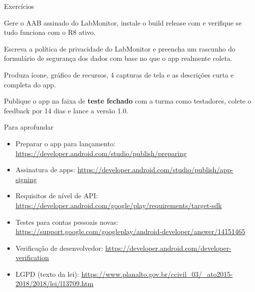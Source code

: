 \documentclass[aspectratio=169,10pt]{beamer}
\begin{document}
\begin{frame}{Exercícios}
  \begin{exercicio}
    Gere o AAB assinado do LabMonitor, instale o build release com  e verifique se tudo funciona com o R8 ativo.
  \end{exercicio}
  \begin{exercicio}
    Escreva a política de privacidade do LabMonitor e preencha um rascunho do formulário de segurança dos dados com base no que o app realmente coleta.
  \end{exercicio}
  \begin{exercicio}
    Produza ícone, gráfico de recursos, 4 capturas de tela e as descrições curta e completa do app.
  \end{exercicio}
  \begin{projeto}
    Publique o app na faixa de \textbf{teste fechado} com a turma como testadores, colete o feedback por 14 dias e lance a versão 1.0.
  \end{projeto}
\end{frame}

\begin{frame}{Para aprofundar}
  \small
  \begin{itemize}
    \item Preparar o app para lançamento: \url{https://developer.android.com/studio/publish/preparing}
    \item Assinatura de apps: \url{https://developer.android.com/studio/publish/app-signing}
    \item Requisitos de nível de API: \url{https://developer.android.com/google/play/requirements/target-sdk}
    \item Testes para contas pessoais novas: \url{https://support.google.com/googleplay/android-developer/answer/14151465}
    \item Verificação de desenvolvedor: \url{https://developer.android.com/developer-verification}
    \item LGPD (texto da lei): \url{https://www.planalto.gov.br/ccivil_03/_ato2015-2018/2018/lei/l13709.htm}
  \end{itemize}
\end{frame}
\end{document}
